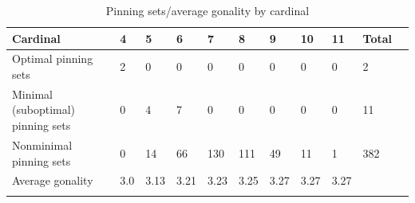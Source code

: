 \documentclass{article}%
\begin{document}
\begin{table}[ht]
	\caption{Pinning sets/average gonality by cardinal}
	\centering
	\renewcommand{\arraystretch}{1.5}
	\begin{tabularx}{\textwidth}{lXXXXXXXXXX}
		\toprule
			Cardinal & 4 & 5 & 6 & 7 & 8 & 9 & 10 & 11 & Total\\
			\hline
			Optimal pinning sets & 2 & 0 & 0 & 0 & 0 & 0 & 0 & 0 & 2 \\
			Minimal (suboptimal) pinning sets & 0 & 4 & 7 & 0 & 0 & 0 & 0 & 0 & 11 \\
			Nonminimal pinning sets & 0 & 14 & 66 & 130 & 111 & 49 & 11 & 1 & 382 \\
			Average gonality & 3.0 & 3.13 & 3.21 & 3.23 & 3.25 & 3.27 & 3.27 & 3.27 &  \\
		\bottomrule \\ 
	\end{tabularx}
\end{table}
\end{document}
